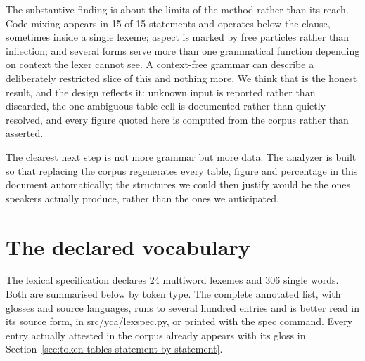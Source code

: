 \documentclass[11pt,a4paper]{article}
\begin{document}
The substantive finding is about the limits of the method rather than its reach. Code-mixing appears in 15 of 15 statements and operates below the clause, sometimes inside a single lexeme; aspect is marked by free particles rather than inflection; and several forms serve more than one grammatical function depending on context the lexer cannot see. A context-free grammar can describe a deliberately restricted slice of this and nothing more. We think that is the honest result, and the design reflects it: unknown input is reported rather than discarded, the one ambiguous table cell is documented rather than quietly resolved, and every figure quoted here is computed from the corpus rather than asserted.

The clearest next step is not more grammar but more data. The analyzer is built so that replacing the corpus regenerates every table, figure and percentage in this document automatically; the structures we could then justify would be the ones speakers actually produce, rather than the ones we anticipated.

\appendix
\section{The declared vocabulary}
\label{sec:the-declared-vocabulary}
The lexical specification declares 24 multiword lexemes and 306 single words. Both are summarised below by token type. The complete annotated list, with glosses and source languages, runs to several hundred entries and is better read in its source form, in src/yca/lexspec.py, or printed with the spec command. Every entry actually attested in the corpus already appears with its gloss in Section~\ref{sec:token-tables-statement-by-statement}.
\end{document}
